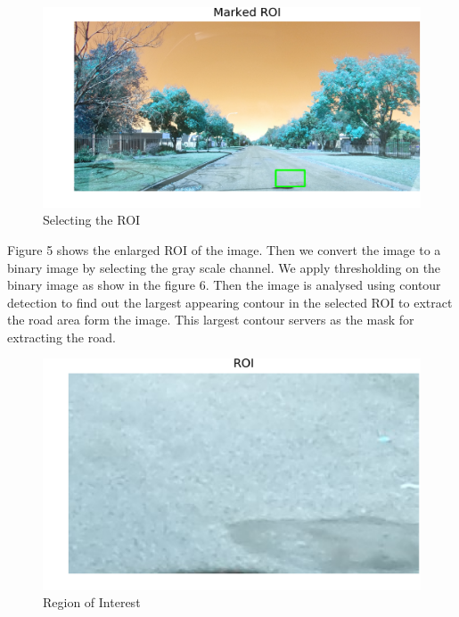 \documentclass[journal]{IEEEtran}
\begin{document}
\begin{figure}[!htb]
\begin{center}
\includegraphics[scale=1]{Images/2_Marked_ROI.png}
\end{center}
\caption{Selecting the ROI}
\end{figure}

Figure 5 shows the enlarged ROI of the image. Then we convert the image to a binary image by selecting the gray scale channel. We apply thresholding on the binary image as show in the figure 6. Then the image is analysed using contour detection to find out the largest appearing contour in the selected ROI to extract the road area form the image. This largest contour servers as the mask for extracting the road. 

\begin{figure}[!htb]
\begin{center}
\includegraphics[scale=0.65]{Images/3_ROI.png}
\end{center}
\caption{Region of Interest}
\end{figure}
\end{document}
